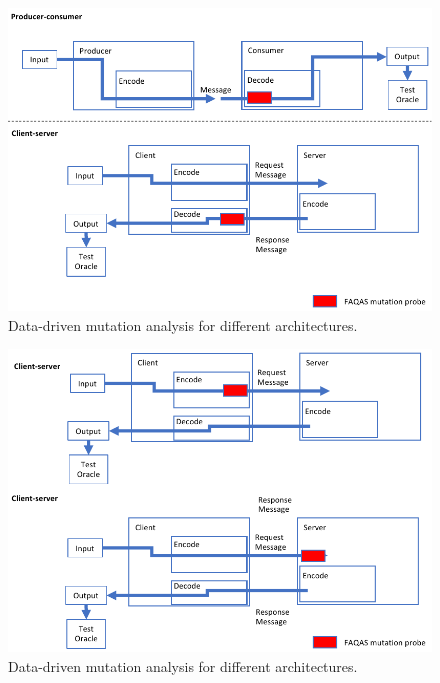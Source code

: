\begin{figure}[h]
  \centering
    \includegraphics[width=14cm]{images/dataDrivenTestSuiteAugmentationD}
      \caption{Data-driven mutation analysis for different architectures.}
      \label{fig:dataDrivenTestSuiteAugmentationD}
\end{figure}

\begin{figure}[h]
  \centering
    \includegraphics[width=14cm]{images/dataDrivenTestSuiteAugmentationE}
      \caption{Data-driven mutation analysis for different architectures.}
      \label{fig:dataDrivenTestSuiteAugmentationE}
\end{figure}

